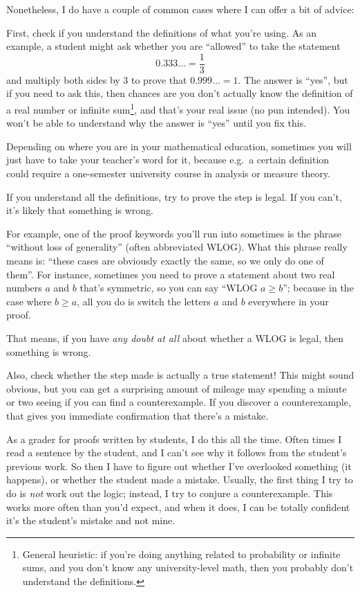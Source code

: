 \documentclass[11pt]{scrartcl}
\begin{document}
Nonetheless, I do have a couple of common cases
where I can offer a bit of advice:
\begin{itemize}
  \ii First,
  \alert{check if you understand the definitions of what you're using}.
  As an example, a student might ask whether you
  are ``allowed'' to take the statement
  \[ 0.333\ldots = \frac13 \]
  and multiply both sides by $3$ to prove that $0.999\ldots = 1$.
  The answer is ``yes'',  but if you need to ask this,
  then chances are you don't actually know the definition
  of a real number or infinite sum\footnote{General heuristic:
    if you're doing anything related to probability or infinite sums,
    and you don't know any university-level math,
    then you probably don't understand the definitions.},
    and that's your real issue (no pun intended).
  You won't be able to understand why the answer is ``yes'' until you fix this.

  Depending on where you are in your mathematical education, sometimes you
  will just have to take your teacher's word for it,
  because e.g.\ a certain definition could require
  a one-semester university course in analysis or measure theory.

  \ii If you understand all the definitions,
  \alert{try to prove the step is legal}.
  If you can't, it's likely that something is wrong.

  For example, one of the proof keywords you'll run into sometimes
  is the phrase ``without loss of generality'' (often abbreviated WLOG).
  What this phrase really means is:
  ``these cases are obviously exactly the same, so we only do one of them''.
  For instance, sometimes you need to prove a statement about two
  real numbers $a$ and $b$ that's symmetric,
  so you can say ``WLOG $a \ge b$'';
  because in the case where $b \ge a$,
  all you do is switch the letters $a$ and $b$ everywhere in your proof.

  That means, if you have \emph{any doubt at all}
  about whether a WLOG is legal, then something is wrong.

  \ii Also, \alert{check whether the step made is actually a true statement}!
  This might sound obvious, but you can get a surprising amount of mileage
  may spending a minute or two seeing if you can find a counterexample.
  If you discover a counterexample,
  that gives you immediate confirmation that there's a mistake.

  As a grader for proofs written by students, I do this all the time.
  Often times I read a sentence by the student,
  and I can't see why it follows from the student's previous work.
  So then I have to figure out whether I've overlooked something (it happens),
  or whether the student made a mistake.
  Usually, the first thing I try to do is \emph{not} work out the logic;
  instead, I try to conjure a counterexample.
  This works more often than you'd expect, and when it does,
  I can be totally confident it's the student's mistake and not mine.
\end{itemize}
\end{document}
